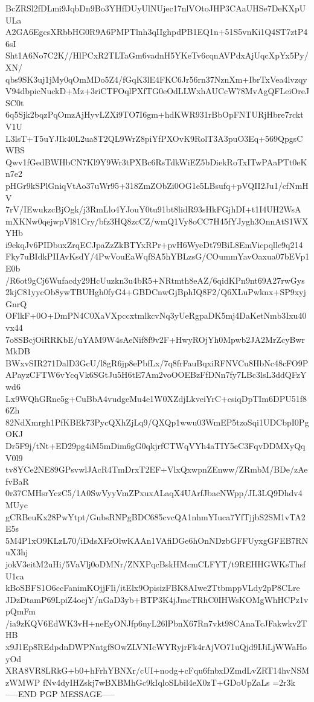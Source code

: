 BcZRSl2fDLmi9JqbDn9Bo3YHfDUyUlNUjec17nlVOtoJHP3CAaUHSe7DeKXpUULa
A2GA6EgcsXRbbHG0R9A6PMPTlnh3qIIghpdPB1EQ1n+51S5vnKi1Q4ST7ztP46sI
Sht1A6No7C2K//HlPCxR2TLTaGm6vadnH5YKeTv6cqnAVPdxAjUqcXpYx5Py/XN/
qbs9SK3uj1jMy0qOmMDo5Z4/fGqK3lE4FKC6Jr56rn37NznXm+IbrTxVea4lvzqy
V94dbpicNuckD+Mz+3riCTFOqlPXfTG0eOdLLWxhAUCcW78MvAgQFLeiOreJSC0t
6q5Sjk2bqzPqOmzAjHyvLZXi9TO7I6gm+hdKWR931rBbOpFNTURjHbre7rcktV1U
L3lsT+T5uYJIk40L2ua8T2QL9WrZ8piYfPXOvK9RolT3A3puO3Eq+569QpgsCWBS
Qwv1fGedBWHbCN7Kl9Y9Wr3tPXBc6RsTdkWiEZ5bDiekRoTxITwPAaPTt0eKn7e2
pHGr9kSPlGniqVtAo37uWr95+318ZmZObZi0OG1e5LBsufq+pVQII2Ju1/cfNmHV
7rV/IEwukzcBjOgk/j3RmLlo4YJouY0tu91bt8lidR93sHkFGjhDI+t1I4UH2WsA
mXKNw0qejwpVl81Cry/bfz3HQ8zcCZ/wmQ1Vy8oCC7H45fYJygh3OnnAtS1WXYHb
i9ekqJv6PIDbuxZrqECJpaZzZkBTYxRPr+pvH6WyeDt79BiL8EmVicpqlle9q214
Fky7uBIdkPIIAvKsdY/4PwVouEaWqfSA5hYBLzsG/COummYavOaxua07bEVp1E0b
/R6ot9gCj6Wufacdy29HcUuzkn3u4bR5+NRtmth8eAZ/6qidKPn9nt69A27rwGys
2kjC81yycOb8ywTBUHgh0fyG4+GBDCnwGjBphIQ8F2/Q6XLuPwknx+SP9xyjGnrQ
OFlkF+0O+DmPN4C0XaVXpccxtmlkcvNq3yUeRgpaDK5mj4DaKetNmb3Ixu40vx44
7o8SBcjOiRRKbE/uYAM9W4sAeNif8f9v2F+HwyROjYh0Mpwb2JA2MrZcyBwrMkDB
BWxvSIR271DalD3GcU/l8gR6jp8ePbfLx/7q8frFauBqxiRFNVCu8HbNc48cFO9P
APayzCFTW6vYcqVk6SGtJu5H6tE7Am2voOOEBzFfDNn7fy7LBc3lsL3ddQFzYwd6
Lx9WQhGRne5g+CuBbA4vudgeMu4e1W0XZdjLkveiYrC+csiqDpTIm6DPU51f86Zh
82NdXmrgh1PfKBEk73PycQXhZjLq9/QXQp1wwu03WmEP5tzoSqi1UDCbpI0PgOKJ
Dr5F9j/tNt+ED29pg4iM5mDim6gG0qkjrfCTWqVYh4aTIY5eC3FqvDDMXyQqV0l9
tv8YCe2NE89GPsvwlJAcR4TmDrxT2EF+VlxQxwpnZEnww/ZRmbM/BDe/zAefvBaR
0r37CMHsrYczC5/1A0SwVyyVmZPxuxALaqX4UArfJbacNWpp/JL3LQ9Dhdv4MUyc
gCRBeuKx28PwYtpt/GubsRNPgBDC685cvcQA1nhmYIuca7YfTjjbS2SM1vTA2E5s
5M4P1xO9KLzL70/iDdsXFzOlwKAAn1VAfiDGe6hOnNDzbGFFUyxgGFEB7RNuX3hj
jokV3eitM2uHi/5VaVlj0oDMNr/ZNXPqcBskHMcmCLFYT/t9REHHGWKsThsfU1ca
kBoSBFS1O6ccFanimKOjjFIi/itElx9OpisizFBK8AIwe2TtbmppVLdy2pP8CLre
JDzDtamP69LpiZ4ocjY/nGaD3yb+BTP3K4jJmcTRhC0IHWsKOMgWhHCPz1vpQmFm
/ia9zKQV6EdWK3vH+neEyONJfp6nyL26lPbnX67Rn7vkt98CAnaTcJFakwkv2THB
x9J1Ep8REdpdnDWPNntgf8OwZLVNIcWYRyjrFk4rAjVO71uQjd9IJiLjWWaHoyOd
XRA8VR8LRkG+b0+hFrhYBNXr/cUI+nodg+cFqu6fnbxDZmdLvZRT14hvNSMzWMWP
fNv4dyIHZskj7wBXBMhGc9kIqloSLbil4eX0zT+GDoUpZaLs
=2r3k
-----END PGP MESSAGE-----
